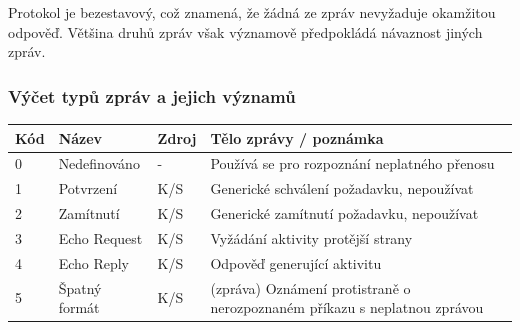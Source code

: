\documentclass[12pt,a4paper]{article}
\begin{document}
Protokol je bezestavový, což znamená, že žádná ze zpráv nevyžaduje okamžitou odpověď. Většina druhů zpráv však významově předpokládá návaznost jiných zpráv.

\subsubsection{Výčet typů zpráv a jejich významů}
\begin{table}[h]
\center
\begin{tabular}{|l|p{3cm}|l|p{10cm}|}
\hline
\textbf{Kód} & \textbf{Název} & \textbf{Zdroj} & \textbf{Tělo zprávy / poznámka}\\ \hline
0 & Nedefinováno & - & Používá se pro rozpoznání neplatného přenosu \\ \hline
1 & Potvrzení & K/S & Generické schválení požadavku, nepoužívat \\ \hline
2 & Zamítnutí & K/S & Generické zamítnutí požadavku, nepoužívat \\ \hline
3 & Echo Request & K/S & Vyžádání aktivity protější strany \\ \hline
4 & Echo Reply & K/S & Odpověď generující aktivitu \\ \hline
5 & Špatný formát & K/S & (zpráva) Oznámení protistraně o nerozpoznaném příkazu s neplatnou zprávou\\ \hline

\end{tabular}
\end{table}
\end{document}
